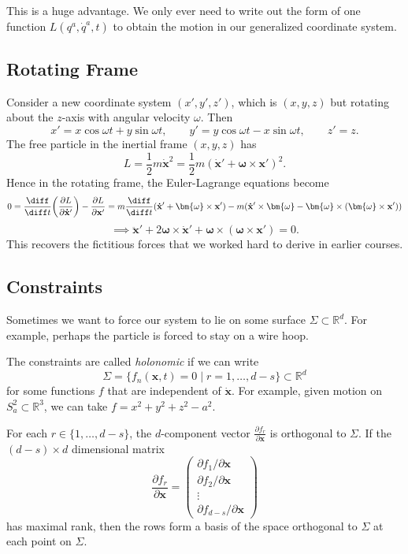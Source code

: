 \documentclass[12pt]{article}
\begin{document}
This is a huge advantage. We only ever need to write out the form of one function $L(q^a, \dot q^a, t)$ to obtain the motion in our generalized coordinate system.

\subsection{Rotating Frame}
\label{sub:rot}

Consider a new coordinate system $(x', y', z')$, which is $(x, y, z)$ but rotating about the $z$-axis with angular velocity $\omega$. Then
\[
x' = x \cos \omega t + y \sin \omega t, \qquad y' = y \cos \omega t - x \sin \omega t, \qquad z' = z.
\]
The free particle in the inertial frame $(x, y, z)$ has
\[
L = \frac{1}{2} m \mathbf{\dot x}^2 = \frac{1}{2} m (\mathbf{\dot x}' + \bm{\omega} \times \mathbf{x}' )^2.
\]
Hence in the rotating frame, the Euler-Lagrange equations become
\[
	0 = \frac{\diff}{\diff t} \biggl( \frac{\partial L}{\partial \mathbf{\dot x}'} \biggr) - \frac{\partial L}{\partial \mathbf{x}'} = m \frac{\diff}{\diff t} (\mathbf{\dot x}' + \bm{\omega} \times \mathbf{x}') - m(\mathbf{\dot x}' \times \bm{\omega} - \bm{\omega} \times (\bm{\omega} \times \mathbf{x}'))
\]
\[
	\implies \mathbf{\ddot x}' + 2 \bm{\omega} \times \mathbf{\dot x}' + \bm{\omega} \times(\bm{\omega} \times \mathbf{x}') = 0.
\]
This recovers the fictitious forces that we worked hard to derive in earlier courses.

\subsection{Constraints}
\label{sub:constraints}

Sometimes we want to force our system to lie on some surface $\Sigma \subset \mathbb{R}^{d}$. For example, perhaps the particle is forced to stay on a wire hoop.

The constraints are called \emph{holonomic} if we can write
\[
	\Sigma = \{f_n(\mathbf{x}, t) = 0 \mid r = 1, \ldots, d-s \} \subset \mathbb{R}^{d}
\]
for some functions $f$ that are independent of $\mathbf{\dot x}$. For example, given motion on $S_a^2 \subset \mathbb{R}^3$, we can take $f = x^2 + y^2 + z^2 - a^2$.

For each $r \in \{1, \ldots, d-s\}$, the $d$-component vector $\frac{\partial f_r}{\partial \mathbf{x}}$ is orthogonal to $\Sigma$. If the $(d-s) \times d$ dimensional matrix
\[
\frac{\partial f_r}{\partial \mathbf{x}} =
\begin{pmatrix}
	\partial f_1/\partial \mathbf{x} \\
	\partial f_2 / \partial \mathbf{x} \\
	\vdots \\
	\partial f_{d-s} / \partial \mathbf{x}
\end{pmatrix}
\]
has maximal rank, then the rows form a basis of the space orthogonal to $\Sigma$ at each point on $\Sigma$.
\end{document}
